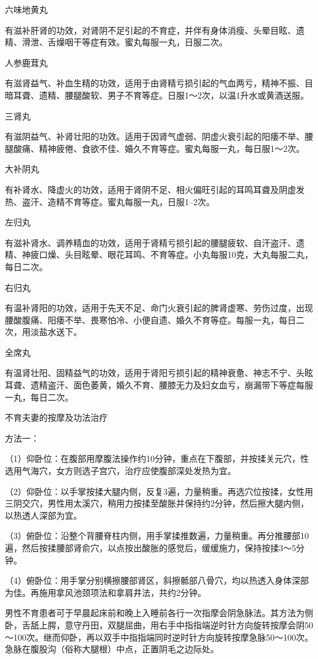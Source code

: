 \documentclass[12pt,UTF8]{ctexbook}
\begin{document}
六味地黄丸

有滋补肝肾的功效，对肾阴不足引起的不育症，并伴有身体消瘦、头晕目眩、遗精、滑泄、舌燥咽干等症有效。蜜丸每服一丸，日服二次。

人参鹿茸丸

有滋肾益气、补血生精的功效，适用于由肾精亏损引起的气血两亏，精神不振、目暗耳聋、遗精、腰腿酸软、男子不育等症。日服1～2次，以温1升水或黄酒送服。

三肾丸

有滋阴益气、补肾壮阳的功效。适用于因肾气虚弱、阴虚火衰引起的阳痿不举、腰腿酸痛、精神疲倦、食欲不佳、婚久不育等症。蜜丸每服一丸，每日服1～2次。

大补阴丸

有补肾水、降虚火的功效，适用于肾阴不足、相火偏旺引起的耳鸣耳聋及阴虚发热、盗汗、造精不育等症。蜜丸每服一丸，日服1--2次。

左归丸

有滋补肾水、调养精血的功效，适用于肾精亏损引起的腰腿疲软、自汗盗汗、遗精、神疲口燥、头目眩晕、眼花耳鸣、不育等症。小丸每服10克，大丸每服二丸，每日二次。

右归丸

有温补肾阳的功效，适用于先天不足、命门火衰引起的脾肾虚寒、劳伤过度，出现腰酸腹痛、阳痿不举、畏寒怕冷、小便自遗、婚久不育等症。每服一丸，每日二次，用淡盐水送下。

全席丸

有温肾壮阳、固精益气的功效，适用于肾阳亏损引起的精神衰惫、神志不宁、头眩耳聋、遗精盗汗、面色萎黄，婚久不育、腰膝无力及妇女血亏，崩漏带下等症每服一丸，每日二次。





不育夫妻的按摩及功法治疗


方法一：

（1）仰卧位：在腹部用摩腹法操作约10分钟，重点在下腹部，并按揉关元穴，性选用气海穴，女方则选子宫穴，治疗应使腹部深处发热为宜。

（2）仰卧位：以手掌按揉大腿内侧，反复3遍，力量稍重。再选穴位按揉，女性用三阴交穴，男性用太溪穴，稍用力按揉至酸胀并保持约2分钟，然后擦大腿内侧，以热透人深部为宜。

（3）俯卧位：沿整个背腰脊柱内侧，用手掌揉推数遍，力量稍重。再分推腰部10遍，然后按揉腰部肾俞穴，以点按出酸胀的感觉后，缓缓施力，保持按揉3～5分钟。

（4）俯卧位：用手掌分别横擦腰部肾区，斜擦骶部八骨穴，均以热透入身体深部为佳。再施用拿风池颈项法和拿肩井法，共约2分钟。

男性不育患者可于早晨起床前和晚上入睡前各行一次指摩会阴急脉法。其方法为侧卧，舌舐上腭，意守丹田，双腿屈曲，用右手中指指端逆时针方向旋转按摩会阴50～100次。继而仰卧，再以双手中指指端同时逆时针方向旋转按摩急脉50～100次。急脉在腹股沟（俗称大腿根）中点，正置阴毛之边际处。
\end{document}
